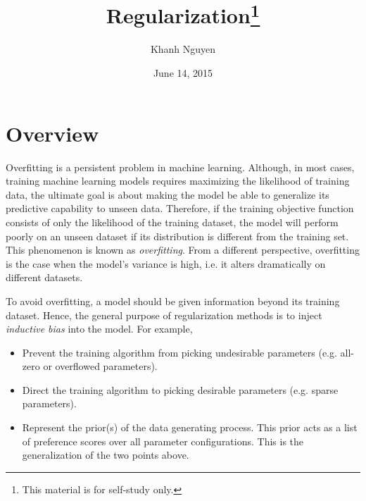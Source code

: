 \documentclass[11pt,letterpaper]{article}
\title{
	Regularization\footnote{This material is for self-study only.}
}
\author{
	Khanh Nguyen
}
\date{June 14, 2015}
\begin{document}
\maketitle

\section{Overview}

Overfitting is a persistent problem in machine learning. Although, in most cases, training machine learning models requires maximizing the likelihood of training data, the ultimate goal is about making the model be able to generalize its predictive capability to unseen data. Therefore, if the training objective function consists of only the likelihood of the training dataset, the model will perform poorly on an unseen dataset if its distribution is different from the training set. This phenomenon is known as \emph{overfitting}. From a different perspective, overfitting is the case when the model's variance is high, i.e. it alters dramatically on different datasets. 

To avoid overfitting, a model should be given information beyond its training dataset. Hence, the general purpose of regularization methods is to inject \emph{inductive bias} into the model. For example,
\begin{itemize}
\item Prevent the training algorithm from picking undesirable parameters (e.g. all-zero or overflowed parameters). 
\item Direct the training algorithm to picking desirable parameters (e.g. sparse parameters).  
\item Represent the prior(s) of the data generating process. This prior acts as a list of preference scores over all parameter configurations. This is the generalization of the two points above.
\end{itemize}
\end{document}
